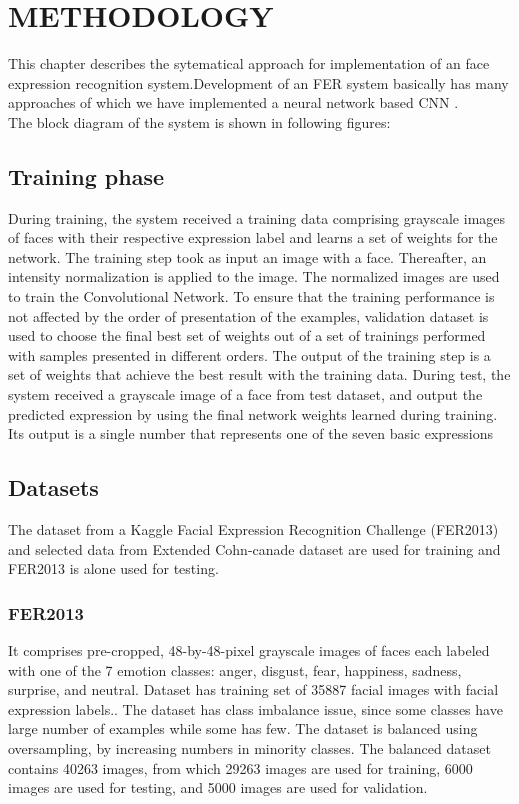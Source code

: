 \documentclass[12pt,a4paper,final]{extreport}
\begin{document}
\newpage
\chapter{METHODOLOGY}
This chapter describes the sytematical approach for implementation of an face expression recognition system.Development of an FER system basically has many approaches of which we have implemented a neural network based CNN .\\
The block diagram of the system is shown in following figures:

\section{Training phase}
During training, the system received a training data comprising grayscale images of faces with their respective expression label and learns a set of weights for the network. The training step took as input an image with a face. Thereafter, an intensity normalization is applied to the image. The normalized images are used to train the Convolutional Network. To ensure that the training performance is not affected by the order of presentation of the examples, validation dataset is used to choose the final best set of weights out of a set of trainings performed with samples presented in different orders. The output of the training step is a set of weights that achieve the best result with the training data. During test, the system received a grayscale image of a face from test dataset, and output the predicted expression by using the final network weights learned during training. Its output is a single number that represents one of the seven basic expressions

\section{Datasets}
The dataset from a Kaggle Facial Expression Recognition Challenge (FER2013) and selected data from Extended Cohn-canade dataset are used for training and FER2013 is alone used for testing.
\subsection{FER2013}
 It comprises pre-cropped, 48-by-48-pixel grayscale images of faces each labeled with one of the 7 emotion classes: anger, disgust, fear, happiness, sadness, surprise, and neutral. Dataset has training set of 35887 facial images with facial expression labels.. The dataset has class imbalance issue, since some classes have large number of examples while some has few. The dataset is balanced using oversampling, by increasing numbers in minority classes. The balanced dataset contains 40263 images, from which 29263 images are used for training, 6000 images are used for testing, and 5000 images are used for validation. 
\end{document}
